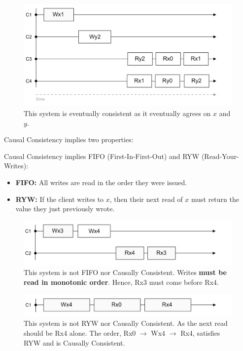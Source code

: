 \begin{figure}[h]
    \centering
    \includegraphics[width=.9\textwidth]{Sections/consist/event.png}
    \caption{This 
    system is eventually consistent as it eventually agrees on $x$ and $y$.}
\end{figure}

\newpage 

\noindent
Causal Consistency implies two properties:

\begin{theo}

    Causal Consistency implies FIFO (First-In-First-Out) and RYW (Read-Your-Writes):
    \begin{itemize}
        \item \textbf{FIFO:} All writes are read in the order they were issued.
        \item \textbf{RYW:} If the client writes to $x$, then their next read of $x$ must return the value they just previously wrote.
    \end{itemize}
\end{theo}

\begin{figure}[h]
    \centering
    \includegraphics[width=.9\textwidth]{Sections/consist/fifo.png}
    \caption{This system is not FIFO nor Causally Consistent. Writes \textbf{must be read in monotonic order}. Hence, Rx3 must come before Rx4.}
\end{figure}

\begin{figure}[h]
    \centering
    \includegraphics[width=.9\textwidth]{Sections/consist/ryw.png}
    \caption{This system is not RYW nor Causally Consistent. As the next read should be Rx4 alone. 
    The order, Rx0 $\rightarrow$ Wx4 $\rightarrow$ Rx4, satisfies RYW and is Causally Consistent.}
\end{figure}


    